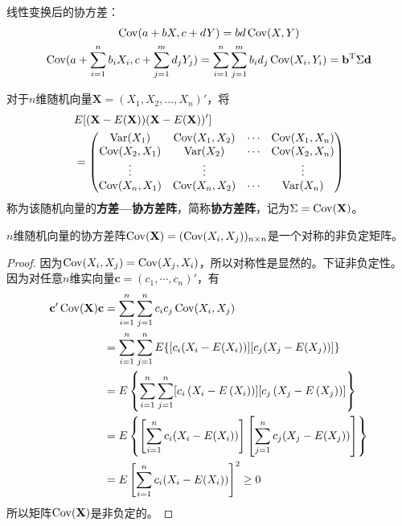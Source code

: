 \begin{corollary}
    线性变换后的协方差：
    \begin{gather*}
        \operatorname{Cov}(a+ b X,c +d Y)  = b d \operatorname{Cov}(X,Y)\\
        \operatorname{Cov}(a+\sum_{i=1}^n b_i X_i,c+\sum_{j=1}^m d_j Y_j) = \sum_{i=1}^n\sum_{j=1}^m b_i d_j \operatorname{Cov}(X_i,Y_i) = \mathbf{b}^{\mathrm{T}}\Sigma \mathbf{d}
    \end{gather*}
\end{corollary}

\begin{definition}[协方差矩阵]
    对于$n$维随机向量$\mathbf{X}=(X_1,X_2,\ldots,X_n)'$，将
    \begin{align*}
         & E[(\mathbf{X}-E(\mathbf{X}))(\mathbf{X}-E(\mathbf{X}))' ] \\
         & =\begin{pmatrix}
                \operatorname{Var}(X_1)     & \operatorname{Cov}(X_1,X_2) & \cdots & \operatorname{Cov}(X_1,X_n) \\
                \operatorname{Cov}(X_2,X_1) & \operatorname{Var}(X_2)     & \cdots & \operatorname{Cov}(X_2,X_n) \\
                \vdots        & \vdots        &        & \vdots        \\
                \operatorname{Cov}(X_n,X_1) & \operatorname{Cov}(X_n,X_2) & \cdots & \operatorname{Var}(X_n)
            \end{pmatrix}
    \end{align*}
    称为该随机向量的\textbf{方差—协方差阵}，简称\textbf{协方差阵}，记为$\Sigma=\operatorname{Cov}(\mathbf{X})$。
\end{definition}

\begin{theorem}
    $n$维随机向量的协方差阵$\operatorname{Cov}(\mathbf{X})=(\operatorname{Cov}(X_i,X_j))_{n\times n}$是一个对称的非负定矩阵。
\end{theorem}
\begin{proof}
    因为$\operatorname{Cov}(X_i,X_j)=\operatorname{Cov}(X_j,X_i)$，所以对称性是显然的。下证非负定性。因为对任意$n$维实向量$\mathbf{c}=(c_1,\cdots ,c_n)'$，有
    \begin{align*}
        \mathbf{c}'\operatorname{Cov}(\mathbf{X})\mathbf{c} & = \sum_{i=1}^n\sum_{j=1}^n c_i c_j \operatorname{Cov}(X_i,X_j)                                                                           \\
                                              & = \sum_{i=1}^n\sum_{j=1}^n E\{ [c_i(X_i-E(X_i))] [c_j(X_j-E(X_j))] \}                                                      \\
                                              & = E\left\{\sum_{i=1}^n \sum_{j=1}^n [c_i\left(X_i-E\left(X_i\right)\right)][c_j\left(X_j-E\left(X_j\right)\right)]\right\} \\
                                              & = E\left\{\left[\sum_{i=1}^n c_i(X_i-E(X_i))\right]\left[\sum_{j=1}^n  c_j(X_j-E(X_j))\right]\right\}                      \\
                                              & = E\left[\sum_{i=1}^n  c_i(X_i-E(X_i))\right]^2 \ge 0
    \end{align*}
    所以矩阵$\operatorname{Cov}(\mathbf{X})$是非负定的。
\end{proof}

